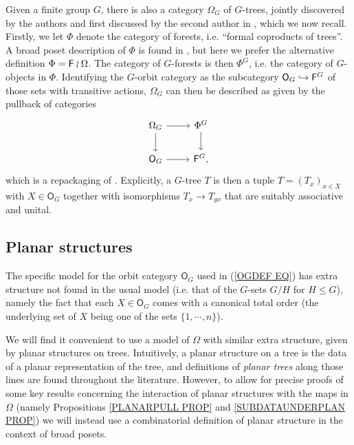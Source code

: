 \documentclass[a4paper,10pt]{article}%
\begin{document}
Given a finite group $G$, there is also a category $\Omega_G$
of $G$-trees, jointly discovered by the authors and first discussed by the second author in 
\cite[\S 4.3,\S 5.3]{Pe17}, which we now recall.
Firstly, we let $\Phi$ denote the category of forests, i.e.
``formal coproducts of trees''.
A broad poset description of $\Phi$ is found in \cite[\S 5.2]{Pe17},
but here we prefer the alternative definition $\Phi = \mathsf{F} \wr \Omega$. The category of $G$-forests is then 
$\Phi^G$, i.e. the category of $G$-objects in $\Phi$. 
Identifying the $G$-orbit category as the subcategory
$\mathsf{O}_G \hookrightarrow \mathsf{F}^G$
of those sets with transitive actions, $\Omega_G$ can then be described as given by the pullback of categories
\begin{equation}\label{OGDEF EQ}
\begin{tikzcd}
	\Omega_G \ar{r} \ar{d} & \Phi^G \ar{d}
\\
	\mathsf{O}_G \ar{r} & \Fin^G,
\end{tikzcd}
\end{equation}
which is a repackaging of \cite[Prop. 5.46]{Pe17}. Explicitly, a $G$-tree $T$ is then a tuple 
$T = (T_x)_{x \in X}$ with $X \in \mathsf{O}_G$
together with isomorphisms
$T_x \to T_{g x}$ that are suitably associative and unital.



\subsection{Planar structures}\label{PLASTR SEC}

The specific model for the orbit category $\mathsf{O}_G$
used in (\ref{OGDEF EQ}) has extra structure not found in the usual model (i.e. that of the $G$-sets $G/H$ for $H \leq G$),
namely the fact that each $X \in \mathsf{O}_G$
comes with a canonical total order 
(the underlying set of $X$ being one of the sets $\{1,\cdots,n\}$).

We will find it convenient to use a model of $\Omega$ with similar extra structure, given by planar structures on trees.
Intuitively, a planar structure on a tree is the data of a planar representation of the tree, and 
definitions of \textit{planar trees} along those lines
are found throughout the literature.
However, to allow for precise proofs of some key results 
concerning the interaction of planar structures with the maps in $\Omega$ 
(namely Propositions \ref{PLANARPULL PROP} and  \ref{SUBDATAUNDERPLAN PROP})
we will instead use a combinatorial definition 
of planar structure in the context of broad posets.
\end{document}
